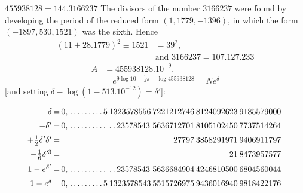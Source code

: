 $455938128=144.3166237$ The divisors of the number $3166237$ were found by developing the period of the reduced form
$(1,1779,-1396)$, in which the form $(-1897,530,1521)$ was the sixth. Hence
\[
\begin{aligned}(11+28.1779)^2\equiv1521&=39^2,\\[6pt]&\text{and }3166237=107.127.233\end{aligned}
\]
\[
\begin{aligned}A&=455938128.10^{-9}.\\[7pt]&\quad{}e^{9\log10-\frac14\pi-\log455938128}=Ne^\delta\end{aligned}
\]
[and setting $\delta-\log(1-513.10^{-12})=\delta'$]:

\begingroup\footnotesize\setlength{\arraycolsep}{1pt}\renewcommand{\arraystretch}{1.12}\[
\begin{array}{r@{\,=\,}r@{\;}l@{\hspace{2pt}}l@{\hspace{2pt}}l@{\hspace{2pt}}l@{\hspace{2pt}}l@{\hspace{2pt}}l}
-\delta & 0{,} & .\,.\,.\,.\,.\,.\,.\,.\,.\,5 & 1323578556 & 7221212746 & 8124092623 & 9185579000 & \\[5pt]
-\delta' & 0{,} & .\,.\,.\,.\,.\,.\,.\,.\,.\,. & .\,.\,23578543 & 5636712701 & 8105102450 & 7737514264 & \\[5pt]
+\tfrac12\delta'\delta' &  &  &  & \phantom{00000}27797 & 3858291971 & 9406911797 & \\[5pt]
-\tfrac16\delta^{\prime3} &  &  &  &  & \phantom{00000000}21 & 8473957577 & \\[5pt]
1-e^{\delta'} & 0{,} & .\,.\,.\,.\,.\,.\,.\,.\,.\,. & .\,.\,23578543 & 5636684904 & 4246810500 & 6804560044 & \\[5pt]
1-e^\delta & 0{,} & .\,.\,.\,.\,.\,.\,.\,.\,.\,5 & 1323578543 & 5515726975 & 9436016940 & 9818422176 & \\[5pt]
\end{array}
\]\endgroup

\clearpage
\endgroup
